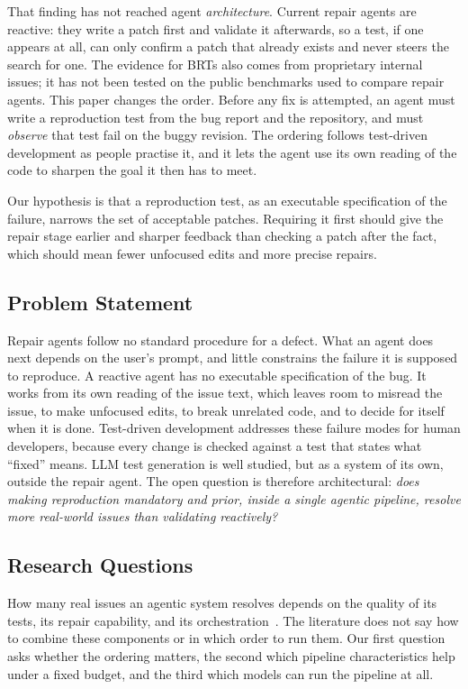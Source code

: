 That finding has not reached agent \emph{architecture}. Current repair agents
are reactive: they write a patch first and validate it afterwards, so a test, if
one appears at all, can only confirm a patch that already exists and never
steers the search for one. The evidence for BRTs also comes from proprietary
internal issues; it has not been tested on the public benchmarks used to
compare repair agents. This paper changes the order. Before any fix is
attempted, an agent must write a reproduction test from the bug report and the
repository, and must \emph{observe} that test fail on the buggy revision. The
ordering follows test-driven development as people practise it, and it lets
the agent use its own reading of the code to sharpen the goal it then has to
meet.

Our hypothesis is that a reproduction test, as an executable specification of
the failure, narrows the set of acceptable patches. Requiring it first should
give the repair stage earlier and sharper feedback than checking a patch after
the fact, which should mean fewer unfocused edits and more precise repairs.

\subsection{Problem Statement}
\label{sec:intro-problem}

Repair agents follow no standard procedure for a defect. What an agent does
next depends on the user's prompt, and little constrains the failure it is
supposed to reproduce. A reactive agent has no executable specification of the
bug. It works from its own reading of the issue text, which leaves room to
misread the issue, to make unfocused edits, to break unrelated code, and to
decide for itself when it is done. Test-driven development addresses these
failure modes for human developers, because every change is checked against a
test that states what ``fixed'' means. LLM test generation is well studied,
but as a system of its own, outside the repair agent. The open question is
therefore architectural: \emph{does making reproduction mandatory and prior, inside a
single agentic pipeline, resolve more real-world issues than validating
reactively?}

\subsection{Research Questions}
\label{sec:intro-rqs}

How many real issues an agentic system resolves depends on the quality of its
tests, its repair capability, and its orchestration~\cite{Meng2024Empirical}.
The literature does not say how to combine these components or in which order
to run them. Our first question asks whether the ordering matters, the second
which pipeline characteristics help under a fixed budget, and the third which
models can run the pipeline at all.

